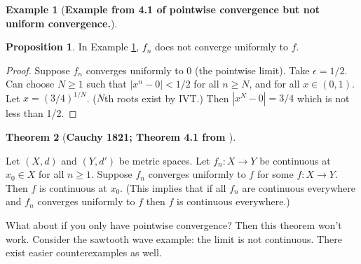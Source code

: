 \documentclass{article}
\theoremstyle{definition}
\newtheorem{theorem}{Theorem}
\theoremstyle{definition}
\newtheorem{proposition}[theorem]{Proposition}
\theoremstyle{definition}
\theoremstyle{definition}
\theoremstyle{definition}
\theoremstyle{definition}
\theoremstyle{definition}
\newtheorem{example}{Example}[section]
\begin{document}
\begin{example}[\textbf{Example from 4.1 of pointwise convergence but not uniform convergence.}]\label{ex.pugh.4.1.pt.convg}

\begin{proposition} In Example \ref{ex.pugh.4.1.pt.convg}, \(f_n\) does not converge uniformly to \(f\).

\end{proposition}

\begin{proof}

Suppose \(f_n\) converges uniformly to 0 (the pointwise limit). Take \(\epsilon = 1/2\). Can choose \(N \geq 1\) such that  \(|x^n - 0 | < 1/2\) for all \(n \geq N\), and for all \(x \in (0,1)\). Let \(x = (3/4)^{1/N}\). (\(N\)th roots exist by IVT.) Then \(|x^N - 0| = 3/4 \) which is not less than 1/2. 

\end{proof}

\end{example}


\begin{theorem}[\textbf{Cauchy 1821; Theorem 4.1 from \citet{pugh2015real}}]\label{ra.thm.41.pugh}

Let \((X,d)\) and \((Y, d')\) be metric spaces. Let \(f_n: X \to Y\) be continuous at \(x_0 \in X\) for all \(n \geq 1\). Suppose \(f_n\) converges uniformly to \(f\) for some \(f:X \to Y\). Then \(f\) is continuous at \(x_0\). (This implies that if all \(f_n\) are continuous everywhere and \(f_n\) converges uniformly to \(f\) then \(f\) is continuous everywhere.)

\end{theorem}


What about if you only have pointwise convergence? Then this theorem won't work. Consider the sawtooth wave example: the limit is not continuous. There exist easier counterexamples as well.
\end{document}
